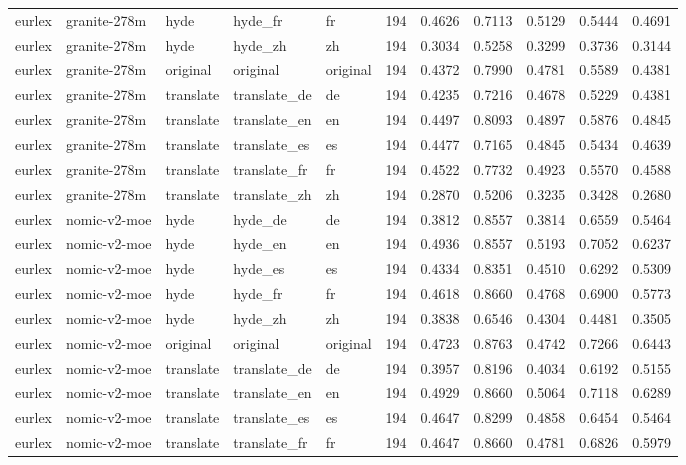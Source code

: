 \begin{tabular}{lllllrrrrrr}
eurlex & granite-278m & hyde & hyde\_fr & fr & 194 & 0.4626 & 0.7113 & 0.5129 & 0.5444 & 0.4691 \\
eurlex & granite-278m & hyde & hyde\_zh & zh & 194 & 0.3034 & 0.5258 & 0.3299 & 0.3736 & 0.3144 \\
eurlex & granite-278m & original & original & original & 194 & 0.4372 & 0.7990 & 0.4781 & 0.5589 & 0.4381 \\
eurlex & granite-278m & translate & translate\_de & de & 194 & 0.4235 & 0.7216 & 0.4678 & 0.5229 & 0.4381 \\
eurlex & granite-278m & translate & translate\_en & en & 194 & 0.4497 & 0.8093 & 0.4897 & 0.5876 & 0.4845 \\
eurlex & granite-278m & translate & translate\_es & es & 194 & 0.4477 & 0.7165 & 0.4845 & 0.5434 & 0.4639 \\
eurlex & granite-278m & translate & translate\_fr & fr & 194 & 0.4522 & 0.7732 & 0.4923 & 0.5570 & 0.4588 \\
eurlex & granite-278m & translate & translate\_zh & zh & 194 & 0.2870 & 0.5206 & 0.3235 & 0.3428 & 0.2680 \\
eurlex & nomic-v2-moe & hyde & hyde\_de & de & 194 & 0.3812 & 0.8557 & 0.3814 & 0.6559 & 0.5464 \\
eurlex & nomic-v2-moe & hyde & hyde\_en & en & 194 & 0.4936 & 0.8557 & 0.5193 & 0.7052 & 0.6237 \\
eurlex & nomic-v2-moe & hyde & hyde\_es & es & 194 & 0.4334 & 0.8351 & 0.4510 & 0.6292 & 0.5309 \\
eurlex & nomic-v2-moe & hyde & hyde\_fr & fr & 194 & 0.4618 & 0.8660 & 0.4768 & 0.6900 & 0.5773 \\
eurlex & nomic-v2-moe & hyde & hyde\_zh & zh & 194 & 0.3838 & 0.6546 & 0.4304 & 0.4481 & 0.3505 \\
eurlex & nomic-v2-moe & original & original & original & 194 & 0.4723 & 0.8763 & 0.4742 & 0.7266 & 0.6443 \\
eurlex & nomic-v2-moe & translate & translate\_de & de & 194 & 0.3957 & 0.8196 & 0.4034 & 0.6192 & 0.5155 \\
eurlex & nomic-v2-moe & translate & translate\_en & en & 194 & 0.4929 & 0.8660 & 0.5064 & 0.7118 & 0.6289 \\
eurlex & nomic-v2-moe & translate & translate\_es & es & 194 & 0.4647 & 0.8299 & 0.4858 & 0.6454 & 0.5464 \\
eurlex & nomic-v2-moe & translate & translate\_fr & fr & 194 & 0.4647 & 0.8660 & 0.4781 & 0.6826 & 0.5979 \\

\end{tabular}
